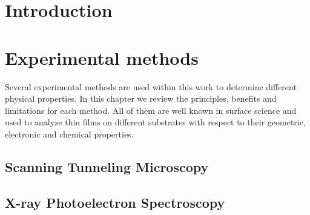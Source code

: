 \documentclass[
10pt,					%
a4paper,				%
twoside,				%
BCOR=8mm,				%
headings=normal,		%
headsepline,			%
footsepline,			%
plainfootsepline,		%
]{scrbook}
\begin{document}

 \frontmatter{}			 														%
 \setcounter{tocdepth}{4}														%
	\tableofcontents{}														 	%
%
\mainmatter{}
\chapter{Introduction}

\chapter{Experimental methods}
Several experimental methods are used within this work to determine different physical properties. In this chapter we review the principles, benefits and limitations for each method. All of them are well known in surface science and used to analyze thin films on different substrates with respect to their geometric, electronic and chemical properties.

  \section{\textbf{S}canning \textbf{T}unneling \textbf{M}icroscopy}
    
  \section{\textbf{X}-ray \textbf{P}hotoelectron \textbf{S}pectroscopy}
	
\end{document}
